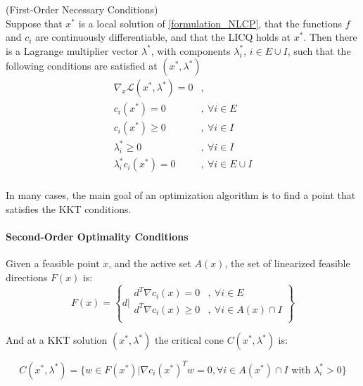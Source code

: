 \begin{theorem}(First-Order Necessary Conditions)\\
  \label{KKT_conditions}
  Suppose that $x^*$ is a local solution of \ref{formulation_NLCP}, that the functions $f$ and $c_i$ are continuously differentiable, and that the LICQ holds at $x^*$.
  Then there is a Lagrange multiplier vector $\lambda^*$, with components $\lambda_i^*$, $i\in E\cup I$, such that the following conditions are satisfied at $(x^*,\lambda^*)$
  \begin{equation}
  \begin{array}{ll}
    \nabla_x\mathcal{L}(x^*,\lambda^*) = 0 &, \\
    c_i(x^*) = 0 &,\ \forall i\in E\\
    c_i(x^*) \geq 0 &,\ \forall i\in I\\
    \lambda_i^* \geq 0 &,\ \forall i\in I\\
    \lambda_i^* c_i(x^*)=0 &,\ \forall i \in E\cup I\\
  \end{array}
  \end{equation}
\end{theorem}

In many cases, the main goal of an optimization algorithm is to find a point that satisfies the KKT conditions.

\paragraph{Second-Order Optimality Conditions}

\begin{definition}
  Given a feasible point $x$, and the active set $\mathit{A}(x)$, the  set of linearized feasible directions $F(x)$ is:
  \begin{equation}
    F(x)=\left\{d|
        \begin{array}{ll}
          d^T\nabla c_i(x) = 0&,\ \forall i\in E \\
          d^T\nabla c_i(x) \geq 0&,\ \forall i\in \mathit{A}(x)\cap I \\
        \end{array}
    \right\}
  \end{equation}
\end{definition}

And at a KKT solution $(x^*,\lambda^*)$ the critical cone $C(x^*, \lambda^*)$ is:

\begin{equation}
  C(x^*,\lambda^*) = \{w\in F(x^*)|\nabla c_i(x^*)^Tw=0, \forall i\in\mathit{A}(x^*)\cap I \text{ with } \lambda_i^*>0\}
\end{equation}

